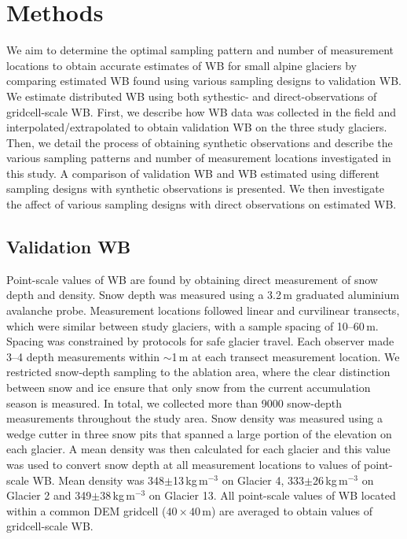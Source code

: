 \documentclass[twocolumn,letterpaper]{igs}
\begin{document}
\section{Methods}

We aim to determine the optimal sampling pattern and number of measurement locations to obtain accurate estimates of WB for small alpine glaciers by comparing estimated WB found using various sampling designs to validation WB. We estimate distributed WB using both sythestic- and direct-observations of gridcell-scale WB. First, we describe how WB data was collected in the field and interpolated/extrapolated to obtain validation WB on the three study glaciers. Then, we detail the process of obtaining synthetic observations and describe the various sampling patterns and number of measurement locations investigated in this study. A comparison of validation WB and WB estimated using different sampling designs with synthetic observations is presented. We then investigate the affect of various sampling designs with direct observations on estimated WB.


\subsection{Validation WB}

Point-scale values of WB are found by obtaining direct measurement of snow depth and density. Snow depth was measured using a 3.2\,m graduated aluminium avalanche probe. Measurement locations followed linear and curvilinear transects, which were similar between study glaciers, with a sample spacing of 10--60\,m.  Spacing was constrained by protocols for safe glacier travel. Each observer made 3--4 depth measurements within $\sim$1\,m at each transect measurement location. We restricted snow-depth sampling to the ablation area, where the clear distinction between snow and ice ensure that only snow from the current accumulation season is measured. In total, we collected more than 9000 snow-depth measurements throughout the study area. Snow density was measured using a wedge cutter in three snow pits that spanned a large portion of the elevation on each glacier. A mean density was then calculated for each glacier and this value was used to convert snow depth at all measurement locations to values of point-scale WB. Mean density was 348$\pm$13\,kg\,m$^{-3}$ on Glacier 4, 333$\pm$26\,kg\,m$^{-3}$ on Glacier 2 and 349$\pm$38\,kg\,m$^{-3}$ on Glacier 13. All point-scale values of WB located within a common DEM gridcell ($40\times40$\,m) are averaged to obtain values of gridcell-scale WB. 
\end{document}
